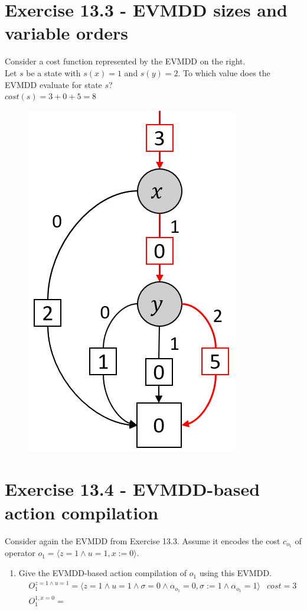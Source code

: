 \documentclass[11pt,a4paper]{article}
\begin{document}
\section*{Exercise 13.3 - EVMDD sizes and variable orders}
Consider a cost function represented by the EVMDD on the right.\\
Let $s$ be a state with $s(x) = 1$ and $s(y) = 2$. To which value does the
EVMDD evaluate for state $s$?\\
$cost(s) = 3 + 0 + 5 = 8$
\begin{figure}[h!]
	\centering
	\includegraphics[scale=0.5]{13_3.png}
\end{figure}
\section*{Exercise 13.4 - EVMDD-based action compilation}
Consider again the EVMDD from Exercise 13.3. Assume it encodes the cost $c_{o_1}$ of operator $o_1 = \langle z = 1 \land u = 1, x := 0\rangle$.

\begin{enumerate}[label=\alph*)]
	\item Give the EVMDD-based action compilation of $o_1$ using this EVMDD.
	\begin{align*}
		&O_1^{z=1 \land u=1} = \langle z = 1 \land u = 1 \land \sigma = 0 \land \alpha_{o_1} = 0, \sigma := 1 \land \alpha_{o_1} = 1\rangle & cost=3&\\
		&O_1^{1, x=0} = 
	\end{align*}
\end{enumerate}
\end{document}
